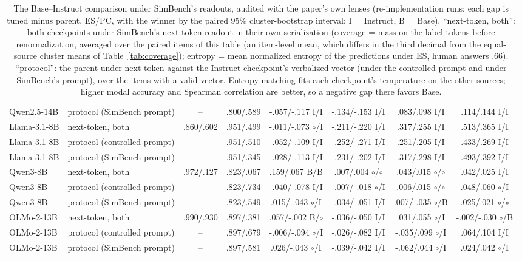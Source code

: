 \begin{table}[t]
\begin{tabular}{@{}llcccccc@{}}
Qwen2.5-14B & protocol (SimBench prompt) & -- & .800/.589 & -.057/-.117 I/I & -.134/-.153 I/I & .083/.098 I/I & .114/.144 I/I \\
Llama-3.1-8B & next-token, both & .860/.602 & .951/.499 & -.011/-.073 $\circ$/I & -.211/-.220 I/I & .317/.255 I/I & .513/.365 I/I \\
Llama-3.1-8B & protocol (controlled prompt) & -- & .951/.510 & -.052/-.109 I/I & -.252/-.271 I/I & .251/.205 I/I & .433/.269 I/I \\
Llama-3.1-8B & protocol (SimBench prompt) & -- & .951/.345 & -.028/-.113 I/I & -.231/-.202 I/I & .317/.298 I/I & .493/.392 I/I \\
Qwen3-8B & next-token, both & .972/.127 & .823/.067 & .159/.067 B/B & .007/.004 $\circ$/$\circ$ & .043/.015 $\circ$/$\circ$ & .042/.025 I/I \\
Qwen3-8B & protocol (controlled prompt) & -- & .823/.734 & -.040/-.078 I/I & -.007/-.018 $\circ$/I & .006/.015 $\circ$/$\circ$ & .048/.060 $\circ$/I \\
Qwen3-8B & protocol (SimBench prompt) & -- & .823/.549 & .015/-.043 $\circ$/I & -.034/-.051 I/I & .007/-.035 $\circ$/B & .025/.021 $\circ$/$\circ$ \\
OLMo-2-13B & next-token, both & .990/.930 & .897/.381 & .057/-.002 B/$\circ$ & -.036/-.050 I/I & .031/.055 $\circ$/I & -.002/-.030 $\circ$/B \\
OLMo-2-13B & protocol (controlled prompt) & -- & .897/.679 & -.006/-.094 $\circ$/I & -.026/-.082 I/I & -.035/.099 $\circ$/I & .064/.104 I/I \\
OLMo-2-13B & protocol (SimBench prompt) & -- & .897/.581 & .026/-.043 $\circ$/I & -.039/-.042 I/I & -.062/.044 $\circ$/I & .024/.042 $\circ$/I \\
\bottomrule
\end{tabular}
\caption{The Base--Instruct comparison under SimBench's readouts, audited with the paper's own lenses (re-implementation runs; each gap is tuned minus parent, ES/PC, with the winner by the paired 95\% cluster-bootstrap interval; I = Instruct, B = Base). ``next-token, both'': both checkpoints under SimBench's next-token readout in their own serialization (coverage = mass on the label tokens before renormalization, averaged over the paired items of this table (an item-level mean, which differs in the third decimal from the equal-source cluster means of Table~\ref{tab:coverage}); entropy = mean normalized entropy of the predictions under ES, human answers .66). ``protocol'': the parent under next-token against the Instruct checkpoint's verbalized vector (under the controlled prompt and under SimBench's prompt), over the items with a valid vector. Entropy matching fits each checkpoint's temperature on the other sources; higher modal accuracy and Spearman correlation are better, so a negative gap there favors Base.}
\label{tab:protocol-audit}
\end{table}
